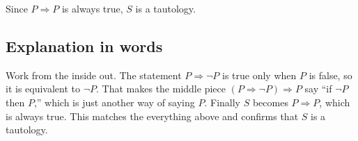 \documentclass[11pt]{article}
\begin{document}
Since $P \Rightarrow P$ is always true, $S$ is a tautology.

\subsection*{Explanation in words}

Work from the inside out. The statement $P \Rightarrow \neg P$ is true only when $P$ is false, so it is equivalent to $\neg P$. That makes the middle piece $(P \Rightarrow \neg P)\Rightarrow P$ say “if $\neg P$ then $P$,” which is just another way of saying $P$. Finally $S$ becomes $P \Rightarrow P$, which is always true. This matches the everything above and confirms that $S$ is a tautology.
\end{document}

